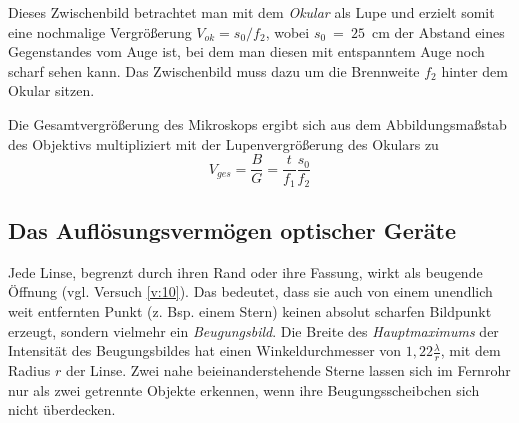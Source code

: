 Dieses Zwischenbild betrachtet man mit dem \textit{Okular} als Lupe und erzielt somit eine nochmalige Vergrößerung $V_{ok}=s_0/f_2$, wobei $s_0~=~25$~cm der Abstand eines Gegenstandes vom Auge ist, bei dem man diesen mit entspanntem Auge noch scharf sehen kann. Das Zwischenbild muss dazu um die Brennweite $f_2$ hinter dem Okular sitzen.

Die Gesamtvergrößerung des Mikroskops ergibt sich aus dem Abbildungsmaßstab des Objektivs multipliziert mit der Lupenvergrößerung des Okulars zu
\begin{equation}
	V_{ges} = \frac{B}{G} = \frac{t}{f_1} \frac{s_0}{f_2}
\label{eq:Vergoesserung_Mikroskop}
\end{equation}

\subsection{Das Auflösungsvermögen optischer Geräte}

Jede Linse, begrenzt durch ihren Rand oder ihre Fassung, wirkt als beugende Öffnung (vgl. Versuch \ref{v:10}). Das bedeutet, dass sie auch von einem unendlich weit entfernten Punkt (z. Bsp. einem Stern) keinen absolut scharfen Bildpunkt erzeugt, sondern vielmehr ein \textit{Beugungsbild}. Die Breite des \textit{Hauptmaximums} der Intensität des Beugungsbildes hat einen Winkeldurchmesser von $1,22\frac{\lambda}{r}$, mit dem Radius $r$ der Linse. Zwei nahe beieinanderstehende Sterne lassen sich im Fernrohr nur als zwei getrennte Objekte erkennen, wenn ihre Beugungsscheibchen sich nicht überdecken.

